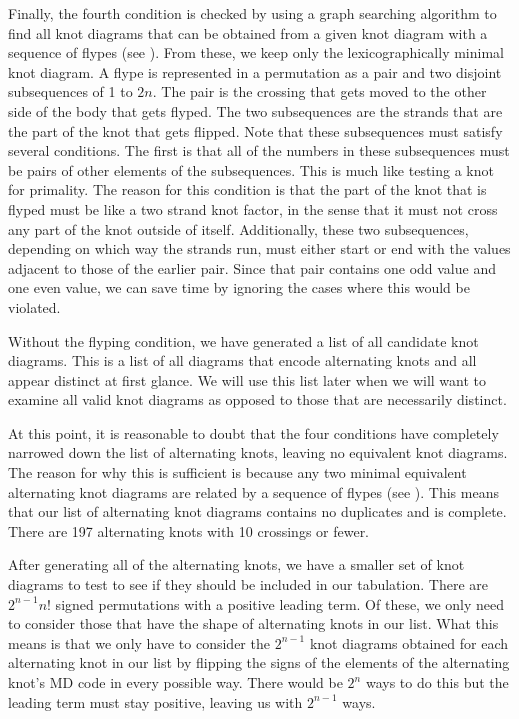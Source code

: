 \begin{paper}

Finally, the fourth condition is checked by using a graph searching algorithm to
find all knot diagrams that can be obtained from a given knot diagram with a
sequence of flypes (see \figMoves).
From these, we keep only the lexicographically minimal knot diagram.
A flype is represented in a permutation as a pair and two disjoint subsequences
of 1 to $2n$.
The pair is the crossing that gets moved to the other side of the body that gets
flyped.
The two subsequences are the strands that are the part of the knot that gets
flipped.
Note that these subsequences must satisfy several conditions.
The first is that all of the numbers in these subsequences must be pairs of
other elements of the subsequences.
This is much like testing a knot for primality.
The reason for this condition is that the part of the knot that is flyped must
be like a two strand knot factor, in the sense that it must not cross any part
of the knot outside of itself.
Additionally, these two subsequences, depending on which way the strands run,
must either start or end with the values adjacent to those of the earlier pair.
Since that pair contains one odd value and one even value, we can save time by
ignoring the cases where this would be violated.


Without the flyping condition, we have generated a list of all candidate knot
diagrams.
This is a list of all diagrams that encode alternating knots and all appear
distinct at first glance.
We will use this list later when we will want to examine all valid knot diagrams
as opposed to those that are necessarily distinct.


At this point, it is reasonable to doubt that the four conditions have
completely narrowed down the list of alternating knots, leaving no equivalent
knot diagrams.
The reason for why this is sufficient is because any two minimal equivalent
alternating knot diagrams are related by a sequence of flypes (see
\cite{flype}).
This means that our list of alternating knot diagrams contains no duplicates and
is complete.
There are 197 alternating knots with 10 crossings or fewer.



After generating all of the alternating knots, we have a smaller set of knot
diagrams to test to see if they should be included in our tabulation.
There are $2^{n-1}n!$ signed permutations with a positive leading term.
Of these, we only need to consider those that have the shape of alternating
knots in our list.
What this means is that we only have to consider the $2^{n-1}$ knot diagrams
obtained for each alternating knot in our list by flipping the signs of the
elements of the alternating knot's MD code in every possible way.
There would be $2^n$ ways to do this but the leading term must stay positive,
leaving us with $2^{n-1}$ ways.


\end{paper}
